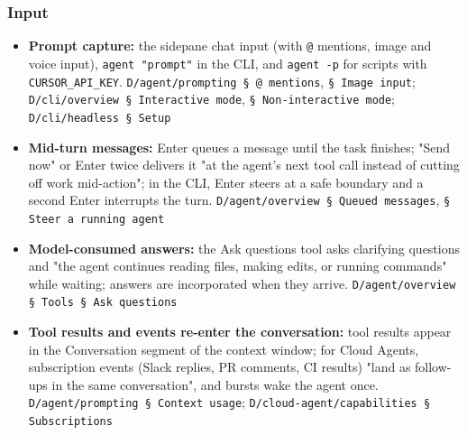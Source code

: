 \subsubsection*{Input}
\begin{itemize}
\item \textbf{Prompt capture:} the sidepane chat input (with \texttt{@} mentions, image and voice input), \texttt{agent "prompt"} in the CLI, and \texttt{agent -\allowbreak{}p} for scripts with \texttt{CURSOR\_\allowbreak{}API\_\allowbreak{}KEY}. \texttt{D/\allowbreak{}agent/\allowbreak{}prompting § @ mentions}, \texttt{§ Image input}; \texttt{D/\allowbreak{}cli/\allowbreak{}overview § Interactive mode}, \texttt{§ Non-\allowbreak{}interactive mode}; \texttt{D/\allowbreak{}cli/\allowbreak{}headless § Setup}
\item \textbf{Mid-turn messages:} Enter queues a message until the task finishes; "Send now" or Enter twice delivers it "at the agent's next tool call instead of cutting off work mid-action"; in the CLI, Enter steers at a safe boundary and a second Enter interrupts the turn. \texttt{D/\allowbreak{}agent/\allowbreak{}overview § Queued messages}, \texttt{§ Steer a running agent}
\item \textbf{Model-consumed answers:} the Ask questions tool asks clarifying questions and "the agent continues reading files, making edits, or running commands" while waiting; answers are incorporated when they arrive. \texttt{D/\allowbreak{}agent/\allowbreak{}overview § Tools § Ask questions}
\item \textbf{Tool results and events re-enter the conversation:} tool results appear in the Conversation segment of the context window; for Cloud Agents, subscription events (Slack replies, PR comments, CI results) "land as follow-ups in the same conversation", and bursts wake the agent once. \texttt{D/\allowbreak{}agent/\allowbreak{}prompting § Context usage}; \texttt{D/\allowbreak{}cloud-\allowbreak{}agent/\allowbreak{}capabilities § Subscriptions}
\end{itemize}

